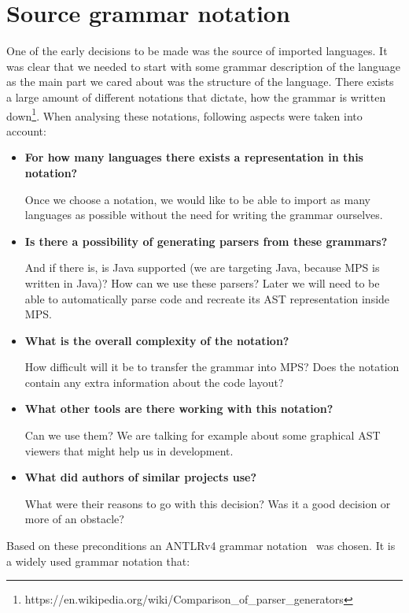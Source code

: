 \chapter{Source grammar notation}
\label{chap:source_grammar_notation}

One of the early decisions to be made was the source of imported languages.
It was clear that we needed to start with some grammar description of the language as the main part we cared about was the structure of the language.
There exists a large amount of different notations that dictate, how the grammar is written down\footnote{https://en.wikipedia.org/wiki/Comparison{\_}of{\_}parser{\_}generators}.
When analysing these notations, following aspects were taken into account:

\begin{itemize}
	\item \textbf{For how many languages there exists a representation in this notation?}

	Once we choose a notation, we would like to be able to import as many languages as possible without the need for writing the grammar ourselves.

	\item \textbf{Is there a possibility of generating parsers from these grammars?}

	And if there is, is Java supported (we are targeting Java, because MPS is written in Java)? How can we use these parsers? Later we will need to be able to automatically parse code and recreate its AST representation inside MPS.

	\item \textbf{What is the overall complexity of the notation?}

	How difficult will it be to transfer the grammar into MPS? Does the notation contain any extra information about the code layout?

	\item \textbf{What other tools are there working with this notation?}

	Can we use them? We are talking for example about some graphical AST viewers that might help us in development.

	\item \textbf{What did authors of similar projects use?}

	What were their reasons to go with this decision? Was it a good decision or more of an obstacle?
\end{itemize}

Based on these preconditions an ANTLRv4 grammar notation~\cite{ANTLR4reference} was chosen. It is a widely used grammar notation that:

